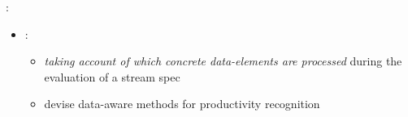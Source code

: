 \documentclass[10pt]{beamer}
\begin{document}
\begin{frame}
  \vspace*{3ex}
  :\\[0.5ex]
  \begin{itemize}
    \item {} :\\[0.5ex] 
      \begin{itemize}
        \item 
          \emph{taking account of which concrete data-elements are processed}
          during the evaluation of a stream spec
          \vspace*{0.5ex}
        \item devise data-aware methods for %
          productivity recognition
      \end{itemize} 
  \end{itemize}

\end{frame}%








\end{document}
